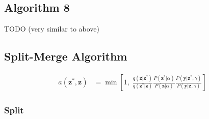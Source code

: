 \documentclass[12pt,letterpaper]{article}
\begin{document}
\subsection{Algorithm 8}
TODO (very similar to above)

\subsection{Split-Merge Algorithm}
\begin{align}
a(\mathbf{z}^*, \mathbf{z}) &= 
\min\left[1, \; \frac{q(\mathbf{z}|\mathbf{z}^*)}{q(\mathbf{z}^*|\mathbf{z})}\frac{P(\mathbf{z}^*|\alpha)}{P(\mathbf{z}|\alpha)}\frac{P(\mathbf{y}|\mathbf{z}^*, \gamma)}{P(\mathbf{y}|\mathbf{z}, \gamma)}\right]
\end{align}

\subsubsection{Split}
\end{document}

